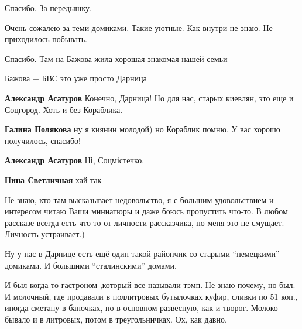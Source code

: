  
 
 
 
 
\zzSecCmt

\begin{itemize} %
Спасибо. За передышку.

Очень сожалею за теми домиками. Такие уютные. Как внутри не знаю. Не приходилось побывать.

Спасибо. Там на Бажова жила хорошая знакомая нашей семьи

Бажова + БВС это уже просто Дарница

\begin{itemize} %
\textbf{Александр Асатуров} Конечно, Дарница! Но для нас, старых киевлян, это еще и Соцгород. Хоть и без Кораблика.

\textbf{Галина Полякова} ну я киянин молодой) но Кораблик помню. У вас хорошо получилось, спасибо!

\textbf{Александр Асатуров} Ні, Соцмістечко.

\textbf{Нина Светличная} хай так
\end{itemize} %


Не знаю, кто там высказывает недовольство, я с большим удовольствием и
интересом читаю Ваши миниатюры и даже боюсь пропустить что-то. В любом рассказе
всегда есть что-то от личности рассказчика, но меня это не смущает. Личность
устраивает.)


Ну у нас в Дарнице есть ещё один такой райончик со старыми \enquote{немецкими} домиками.
И большими \enquote{сталинскими} домами.

И был когда-то гастроном ,который все называли тэмп. Не знаю почему, но был. И
молочный, где продавали в поллитровых бутылочках куфир, сливки по 51 коп., иногда
сметану в баночках, но в основном развесную, как и творог. Молоко бывало и в
литровых, потом в треугольничках. Ох, как давно.


\end{itemize}

